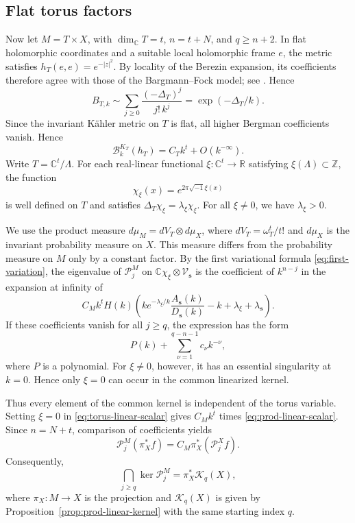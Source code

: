 \documentclass[11pt,reqno]{amsart}
\theoremstyle{corollary}
\theoremstyle{conjecture}
\theoremstyle{assumption}
\theoremstyle{proposition}
\theoremstyle{remark}
\numberwithin{equation}{section}
\newcommand{\ii}{\ensuremath{\sqrt{-1}}}
\begin{document}
\subsection{Flat torus factors}

Now let $M=T\times X$, with $\dim_{\mathbb C}T=t$, $n=t+N$, and $q\geq n+2$. In flat holomorphic coordinates and a suitable local
holomorphic frame $e$, the metric satisfies $h_T(e,e)=e^{-|z|^2}$. By locality of the Berezin expansion, its coefficients therefore agree with those of the Bargmann--Fock model; see \cite[\S2.8.1]{Englis2006Quantization}. Hence
\begin{equation}\label{eq: fock-bergman}
B_{T,k}\sim\sum_{j\geq 0}\frac{(-\Delta_T)^j}{j!\,k^j}=\exp(-\Delta_T/k).
\end{equation}
Since the invariant K\"ahler metric on $T$ is flat, all higher Bergman coefficients vanish. Hence
\[
\mathcal B_k^{K_T}(h_T)=C_Tk^t+O(k^{-\infty}).
\]
Write $T=\mathbb C^t/\Lambda$. For each real-linear functional $\xi\colon\mathbb C^t\to\mathbb R$ satisfying $\xi(\Lambda)\subset\mathbb Z$, the function
\[
\chi_\xi(x)=e^{2\pi\ii\xi(x)}
\]
is well defined on $T$ and satisfies $\Delta_T\chi_\xi=\lambda_\xi\chi_\xi$. For all $\xi\neq 0$, we have $\lambda_\xi>0$.

We use the product measure $d\mu_M=dV_T\otimes d\mu_X$, where $dV_T=\omega_T^t/t!$ and $d\mu_X$ is the invariant probability measure on $X$. This measure differs from the probability measure on $M$ only by a constant factor. By the first variational formula \eqref{eq:first-variation}, the eigenvalue of $\mathcal P_j^M$ on $\mathbb C\chi_\xi\otimes\mathcal V_{\mathbf s}$ is the coefficient of $k^{n-j}$ in the expansion at infinity of
\begin{equation}\label{eq:torus-linear-scalar}
C_Mk^tH(k)\left(k e^{-\lambda_\xi/k}\frac{A_{\mathbf s}(k)}{D_{\mathbf s}(k)}-k+\lambda_\xi+\lambda_{\mathbf s}
\right).
\end{equation}
If these coefficients vanish for all $j\geq q$, the expression has the form
\[
P(k)+\sum_{\nu=1}^{q-n-1}c_\nu k^{-\nu},
\]
where $P$ is a polynomial. For $\xi\neq 0$, however, it has an essential singularity at $k=0$. Hence only $\xi=0$ can occur in the common linearized kernel.

Thus every element of the common kernel is independent of the torus variable. Setting $\xi=0$ in \eqref{eq:torus-linear-scalar} gives $C_Mk^t$ times \eqref{eq:prod-linear-scalar}. Since $n=N+t$, comparison of coefficients yields
\[
\mathcal P_j^M(\pi_X^*f)=C_M\pi_X^*(\mathcal P_j^Xf).
\]
Consequently,
\[
\bigcap_{j\geq q}\ker\mathcal P_j^M=\pi_X^*\mathcal K_q(X),
\]
where $\pi_X\colon M\to X$ is the projection and $\mathcal K_q(X)$ is given by Proposition~\ref{prop:prod-linear-kernel} with the same starting index $q$.
\end{document}
